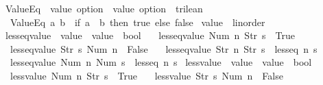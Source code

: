\begin{isabellebody}
\isanewline
{}\isamarkupfalse%
\ ValueEq\ {\isacharcolon}{\isacharcolon}\ {\isachardoublequoteopen}value\ option\ {\isasymRightarrow}\ value\ option\ {\isasymRightarrow}\ trilean{\isachardoublequoteclose}\ \ \isanewline
\ \ {\isachardoublequoteopen}ValueEq\ a\ b\ {\isasymequiv}\ {\isacharparenleft}if\ a\ {\isacharequal}\ b\ then\ true\ else\ false{\isacharparenright}{\isachardoublequoteclose}\isanewline
\isanewline
{}\isamarkupfalse%
\ {\isachardoublequoteopen}value{\isachardoublequoteclose}\ {\isacharcolon}{\isacharcolon}\ linorder\ \isanewline
{}\isamarkupfalse%
\ less{\isacharunderscore}eq{\isacharunderscore}value\ {\isacharcolon}{\isacharcolon}\ {\isachardoublequoteopen}value\ {\isasymRightarrow}\ value\ {\isasymRightarrow}\ bool{\isachardoublequoteclose}\ \isanewline
\ \ {\isachardoublequoteopen}less{\isacharunderscore}eq{\isacharunderscore}value\ {\isacharparenleft}Num\ n{\isacharparenright}\ {\isacharparenleft}Str\ s{\isacharparenright}\ {\isacharequal}\ True{\isachardoublequoteclose}\ {\isacharbar}\isanewline
\ \ {\isachardoublequoteopen}less{\isacharunderscore}eq{\isacharunderscore}value\ {\isacharparenleft}Str\ s{\isacharparenright}\ {\isacharparenleft}Num\ n{\isacharparenright}\ {\isacharequal}\ False{\isachardoublequoteclose}\ {\isacharbar}\isanewline
\ \ {\isachardoublequoteopen}less{\isacharunderscore}eq{\isacharunderscore}value\ {\isacharparenleft}Str\ n{\isacharparenright}\ {\isacharparenleft}Str\ s{\isacharparenright}\ {\isacharequal}\ less{\isacharunderscore}eq\ n\ s{\isachardoublequoteclose}\ {\isacharbar}\isanewline
\ \ {\isachardoublequoteopen}less{\isacharunderscore}eq{\isacharunderscore}value\ {\isacharparenleft}Num\ n{\isacharparenright}\ {\isacharparenleft}Num\ s{\isacharparenright}\ {\isacharequal}\ less{\isacharunderscore}eq\ n\ s{\isachardoublequoteclose}\isanewline
\isanewline
{}\isamarkupfalse%
\ less{\isacharunderscore}value\ {\isacharcolon}{\isacharcolon}\ {\isachardoublequoteopen}value\ {\isasymRightarrow}\ value\ {\isasymRightarrow}\ bool{\isachardoublequoteclose}\ \isanewline
\ \ {\isachardoublequoteopen}less{\isacharunderscore}value\ {\isacharparenleft}Num\ n{\isacharparenright}\ {\isacharparenleft}Str\ s{\isacharparenright}\ {\isacharequal}\ True{\isachardoublequoteclose}\ {\isacharbar}\isanewline
\ \ {\isachardoublequoteopen}less{\isacharunderscore}value\ {\isacharparenleft}Str\ s{\isacharparenright}\ {\isacharparenleft}Num\ n{\isacharparenright}\ {\isacharequal}\ False{\isachardoublequoteclose}\ {\isacharbar}\isanewline

\end{isabellebody}
